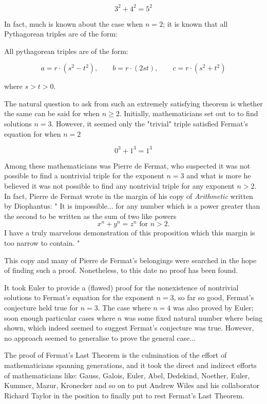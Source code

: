 \[
3^2 + 4^2 = 5^2
\]

In fact, much is known about the case when $n = 2$; it is known that all Pythagorean triples are of the form:

\begin{theorem}
    All pythagorean triples are of the form:

    \[
    a = r \cdot (s^2 - t^2), \qquad b = r \cdot (2st), \qquad c = r \cdot (s^2 + t^2)
    \]

    where $s > t > 0$.
\end{theorem}

The natural question to ask from such an extremely satisfying theorem is whether the same can be said for when $n \ge 2$. Initially, mathematicians set out to
to find solutions $n = 3$. However, it seemed only the "trivial" triple satisfied Fermat's equation for when $n = 2$

\[
0^3 + 1^3 = 1^3
\]

Among these mathematicians was Pierre de Fermat, who suspected it was not possible to find a nontrivial triple for the exponent $n= 3$ and what is more he believed
it was not possible to find any nontrivial triple for any exponent $n > 2$. In fact, Pierre de Fermat wrote in the margin of his copy of \textit{Arithmetic} written by Diophantus:
"
It is impossible... for any number which is a power greater than the second to be written as the sum of two like powers 
\[ 
x^n + y^n = z^n \text{ for } n > 2.
\]
I have a truly marvelous demonstration of this proposition which this margin is too narrow to contain.
"

This copy and many of Pierre de Fermat's belongings were searched in the hope of finding such a proof. Nonetheless, to this date no proof has been found.


It took Euler to provide a (flawed) proof for the nonexistence of nontrivial solutions to Fermat's equation for the exponent $n = 3$, so far so good, Fermat's conjecture held true for $n = 3$.
The case where $n = 4$ was also proved by Euler; soon enough particular cases where $n$ was some fixed natural number where being shown, which indeed seemed to suggest Fermat's conjecture was true.
However, no approach seemed to generalise to prove the general case...

The proof of Fermat's Last Theorem is the culmination of the effort of mathematicians spanning generations, and it took the direct and indirect efforts of mathematicians like: 
Gauss, Galois, Euler, Abel, Dedekind, Noether, Euler, Kummer, Mazur, Kronecker and so on to put Andrew Wiles and his collaborator Richard Taylor in the position 
to finally put to rest Fermat's Last Theorem.


